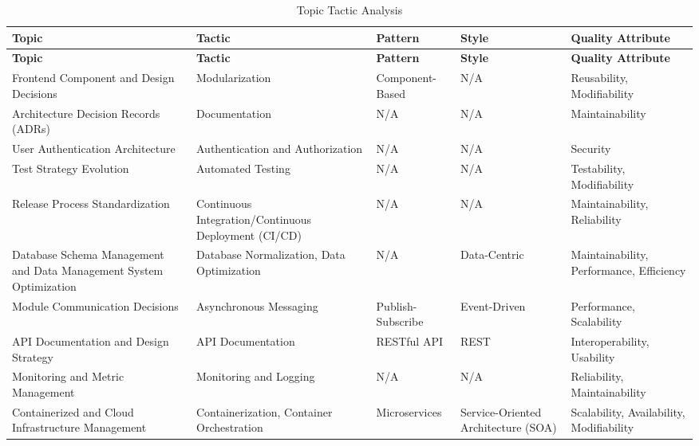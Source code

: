         { \small
        \begin{longtable}{|p{3.8cm}|p{3cm}|p{2.2cm}|p{2.1cm}|p{2.8cm}|}
        \caption{Topic Tactic Analysis}
        \label{table:topic_tactic}
        \hline
        \textbf{Topic} & \textbf{Tactic} & \textbf{Pattern} & \textbf{Style} & \textbf{Quality Attribute} \\
        \hline
        \endfirsthead
    
        \hline
        \textbf{Topic} & \textbf{Tactic} & \textbf{Pattern} & \textbf{Style} & \textbf{Quality Attribute} \\
        \hline
        \endhead
        
        \hline
        \endfoot
        
        \hline
        \endlastfoot
        
        Frontend Component and Design Decisions & Modularization & Component-Based & N/A & Reusability, Modifiability \\
        \hline
        Architecture Decision Records (ADRs) & Documentation & N/A & N/A & Maintainability \\
        \hline
        User Authentication Architecture & Authentication and Authorization & N/A & N/A & Security \\
        \hline
        Test Strategy Evolution & Automated Testing & N/A & N/A & Testability, Modifiability \\
        \hline
        Release Process Standardization & Continuous Integration/Continuous Deployment (CI/CD) & N/A & N/A & Maintainability, Reliability \\
        \hline
        Database Schema Management and Data Management System Optimization & Database Normalization, Data Optimization & N/A & Data-Centric & Maintainability, Performance, Efficiency \\
        \hline
        Module Communication Decisions & Asynchronous Messaging & Publish-Subscribe & Event-Driven & Performance, Scalability \\
        \hline
        API Documentation and Design Strategy & API Documentation & RESTful API & REST & Interoperability, Usability \\
        \hline
        Monitoring and Metric Management & Monitoring and Logging & N/A & N/A & Reliability, Maintainability \\
        \hline
        Containerized and Cloud Infrastructure Management & Containerization, Container Orchestration & Microservices & Service-Oriented Architecture (SOA) & Scalability, Availability, Modifiability \\

\end{longtable}}
